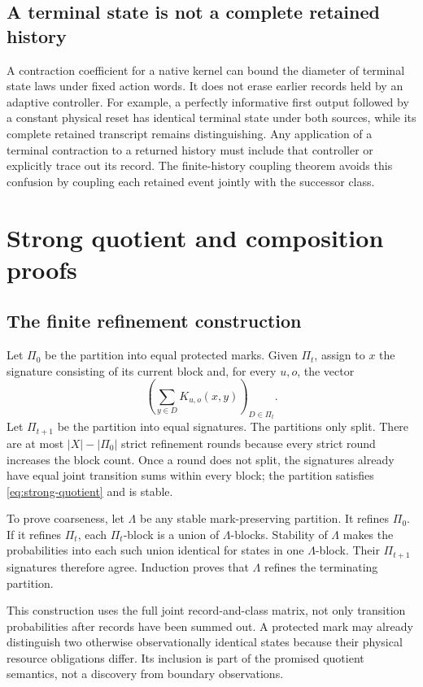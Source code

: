 \subsection{A terminal state is not a complete retained history}
A contraction coefficient for a native kernel can bound the diameter of terminal state laws under fixed action words. It does not erase earlier records held by an adaptive controller. For example, a perfectly informative first output followed by a constant physical reset has identical terminal state under both sources, while its complete retained transcript remains distinguishing. Any application of a terminal contraction to a returned history must include that controller or explicitly trace out its record. The finite-history coupling theorem avoids this confusion by coupling each retained event jointly with the successor class.



\section{Strong quotient and composition proofs}\label{app:composition}
\subsection{The finite refinement construction}
Let \(\Pi_0\) be the partition into equal protected marks. Given \(\Pi_t\), assign to \(x\) the signature consisting of its current block and, for every \(u,o\), the vector
\[
 \left(\sum_{y\in D}K_{u,o}(x,y)\right)_{D\in\Pi_t}.
\]
Let \(\Pi_{t+1}\) be the partition into equal signatures. The partitions only split. There are at most \(|X|-|\Pi_0|\) strict refinement rounds because every strict round increases the block count. Once a round does not split, the signatures already have equal joint transition sums within every block; the partition satisfies \cref{eq:strong-quotient} and is stable.

To prove coarseness, let \(\Lambda\) be any stable mark-preserving partition. It refines \(\Pi_0\). If it refines \(\Pi_t\), each \(\Pi_t\)-block is a union of \(\Lambda\)-blocks. Stability of \(\Lambda\) makes the probabilities into each such union identical for states in one \(\Lambda\)-block. Their \(\Pi_{t+1}\) signatures therefore agree. Induction proves that \(\Lambda\) refines the terminating partition.

This construction uses the full joint record-and-class matrix, not only transition probabilities after records have been summed out. A protected mark may already distinguish two otherwise observationally identical states because their physical resource obligations differ. Its inclusion is part of the promised quotient semantics, not a discovery from boundary observations.

